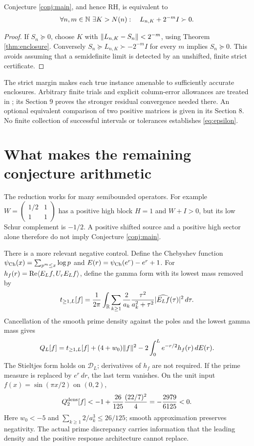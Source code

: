 \begin{corollary}\label{cor:epsilon}
Conjecture \ref{conj:main}, and hence RH, is equivalent to
\begin{equation}\label{eq:epsilon}
\forall n,m\in\mathbb N\ \exists K>N(n):\quad
L_{n,K}+2^{-m}I\succ0.
\end{equation}
\end{corollary}
\begin{proof}
If $S_n\succeq0$, choose $K$ with
$\lVert L_{n,K}-S_n\rVert<2^{-m}$, using Theorem \ref{thm:enclosure}.
Conversely $S_n\succeq L_{n,K}\succ-2^{-m}I$ for every $m$ implies
$S_n\succeq0$. This avoids assuming that a semidefinite limit is detected
by an unshifted, finite strict certificate.
\end{proof}
The strict margin makes each true instance amenable to sufficiently
accurate enclosures. Arbitrary finite trials and explicit column-error
allowances are treated in \cite[Section 10]{Companion}; its Section 9 proves
the stronger residual convergence needed there. An optional equivalent
comparison of two positive matrices is given in its Section 8.
No finite collection of successful intervals or tolerances establishes
\eqref{eq:epsilon}.

\section{What makes the remaining conjecture arithmetic}
The reduction works for many semibounded operators. For example
$W=\left(\begin{smallmatrix}1/2&1\\1&1\end{smallmatrix}\right)$ has
a positive high block $H=1$ and $W+I>0$, but its low Schur complement is
$-1/2$. A positive shifted source and a positive high sector alone therefore
do not imply Conjecture \ref{conj:main}.

There is a more relevant negative control. Define the Chebyshev function
$\psi_{\rm Ch}(x)=\sum_{p^m\le x}\log p$ and
$E(r)=\psi_{\rm Ch}(e^r)-e^r+1$. For
$h_f(r)=\operatorname{Re}\langle E_Lf,U_rE_Lf\rangle$, define the gamma form with its lowest
mass removed by
\[
t_{\ge1,L}[f]=\frac1{2\pi}\int_\mathbb R
\sum_{k\ge1}\frac2{a_k}\frac{\tau^2}{a_k^2+\tau^2}
|\widehat{E_Lf}(\tau)|^2\,d\tau.
\]
Cancellation of the smooth prime density against the poles and the
lowest gamma mass gives
\begin{equation}\label{eq:discrepancy}
Q_L[f]=t_{\ge1,L}[f]+(4+w_0)\lVert f\rVert^2
-2\int_0^L e^{-r/2}h_f(r)\,dE(r).
\end{equation}
The Stieltjes form holds on $\mathcal D_L$; derivatives of $h_f$ are not
required. If the prime measure is replaced by $e^r\,dr$, the last term
vanishes. On the unit input $f(x)=\sin(\pi x/2)$ on $(0,2)$,
\[
Q_2^{\rm dens}[f]<-1+\frac{26}{125}\frac{(22/7)^2}{4}
=-\frac{2979}{6125}<0.
\]
Here $w_0<-5$ and
$\sum_{k\ge1}2/a_k^3\le26/125$; smooth approximation preserves negativity.
The actual prime discrepancy carries information that the leading density
and the positive response architecture cannot replace.

